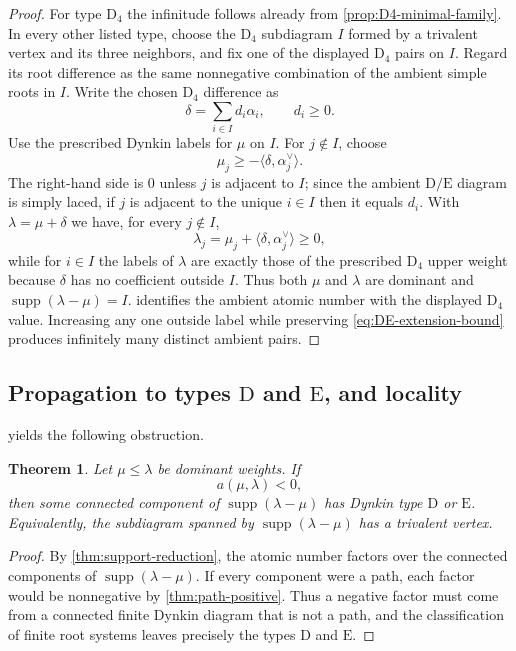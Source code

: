 \documentclass[11pt]{article}
\newtheorem{theorem}{Theorem}[section]
\theoremstyle{definition}
\theoremstyle{remark}
\newcommand{\supp}{\operatorname{supp}}
\newcommand{\typeD}{\ensuremath{\mathrm{D}}}
\newcommand{\typeE}{\ensuremath{\mathrm{E}}}
\begin{document}
\begin{proof}
For type $\typeD_4$ the infinitude follows already from
\cref{prop:D4-minimal-family}.  In every other listed type, choose the
$\typeD_4$ subdiagram $I$ formed by a trivalent vertex and its three neighbors,
and fix one of the displayed $\typeD_4$ pairs on $I$.  Regard its root difference
as the same nonnegative combination of the ambient simple roots in $I$.
Write the chosen $\typeD_4$ difference as
\[
 \delta=\sum_{i\in I}d_i\alpha_i,
 \qquad d_i\ge0.
\]
Use the prescribed Dynkin labels for $\mu$ on $I$.  For $j\notin I$, choose
\begin{equation}\label{eq:DE-extension-bound}
 \mu_j\ge -\langle\delta,\alpha_j^\vee\rangle.
\end{equation}
The right-hand side is $0$ unless $j$ is adjacent to $I$; since the ambient
$\typeD/\typeE$ diagram is simply laced, if $j$ is adjacent to the unique
$i\in I$ then it equals $d_i$.  With
$\lambda=\mu+\delta$ we have, for every $j\notin I$,
\[
 \lambda_j=\mu_j+\langle\delta,\alpha_j^\vee\rangle\ge0,
\]
while for $i\in I$ the labels of $\lambda$ are exactly those of the prescribed
$\typeD_4$ upper weight because $\delta$ has no coefficient outside $I$.
Thus both $\mu$ and $\lambda$ are dominant and
$\supp(\lambda-\mu)=I$.   identifies the ambient
atomic number with the
displayed $\typeD_4$ value.  Increasing any one outside label while preserving
\eqref{eq:DE-extension-bound} produces infinitely many distinct ambient
pairs.
\end{proof}

\subsection{Propagation to types $\typeD$ and $\typeE$, and locality}
 yields the following obstruction.

\begin{theorem}\label{thm:DE-obstruction}
Let $\mu\le\lambda$ be dominant weights.  If
\[
       a(\mu,\lambda)<0,
\]
then some connected component of $\supp(\lambda-\mu)$ has Dynkin type
$\typeD$ or $\typeE$.  Equivalently, the subdiagram spanned by
$\supp(\lambda-\mu)$ has a trivalent vertex.
\end{theorem}

\begin{proof}
By \cref{thm:support-reduction}, the atomic number factors over the connected
components of $\supp(\lambda-\mu)$.  If every component were a path, each
factor would be nonnegative by \cref{thm:path-positive}.  Thus a negative
factor must come from a connected finite Dynkin diagram that is not a path,
and the classification of finite root systems leaves precisely the types
$\typeD$ and $\typeE$.
\end{proof}
\end{document}
